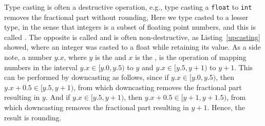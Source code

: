 Type casting is often a destructive operation, e.g., type casting a \lstinline{float} to \lstinline{int} removes the fractional part without rounding,
%
Here we type casted to a lesser type, in the sense that integers is a subset of floating point numbers, and this is called . The opposite is called  and is often non-destructive, as Listing~\ref{upcasting} showed, where an integer was casted to a float while retaining its value. As a side note,  a number $y.x$, where $y$ is the  and $x$ is the , is the operation of mapping numbers in the interval $y.x \in [y.0,y.5)$ to $y$ and $y.x\in [y.5,y+1)$ to $y+1$. This can be performed by downcasting as follows,
%
%
since if $y.x\in [y.0, y.5)$, then $y.x+0.5\in [y.5, y+1)$, from which downcasting removes the fractional part resulting in $y$. And if $y.x\in [y.5, y+1)$, then $y.x+0.5\in [y+1,y+1.5)$, from which downcasting removes the fractional part resulting in $y+1$. Hence, the result is rounding. 

